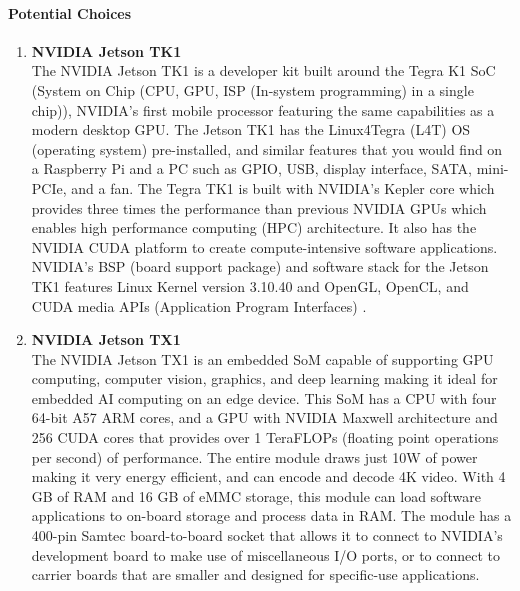 \paragraph{Potential Choices}
	\begin{enumerate}
		\item\textbf{NVIDIA Jetson TK1}\\
			The NVIDIA Jetson TK1 is a developer kit built around the Tegra K1 SoC (System 
			on Chip (CPU, GPU, ISP (In-system programming) in a single chip)), NVIDIA's first 
			mobile processor featuring the same capabilities as a 
			modern desktop GPU\cite{JetsonTK1, TK1Wiki}. The Jetson TK1 has the Linux4Tegra (L4T)
			OS (operating system) pre-installed, and similar features that you would find on a 
			Raspberry Pi and a PC such as GPIO, USB, display interface, SATA, mini-PCIe, and a
			fan\cite{RPiHDWR, TK1Wiki}. The Tegra TK1 is built with NVIDIA's Kepler core which 
			provides three times the performance than previous NVIDIA GPUs which enables high 
			performance computing (HPC) architecture. It also has the NVIDIA CUDA platform to 
			create compute-intensive software applications\cite{KeplerArch}. NVIDIA's BSP (board 
			support package) and software stack for the Jetson TK1 features Linux Kernel version 
			3.10.40 and OpenGL, OpenCL, and CUDA media APIs (Application Program Interfaces)
			\cite{TK1L4T}. \\

		\item\textbf{NVIDIA Jetson TX1}\\
			The NVIDIA Jetson TX1 is an embedded SoM capable of supporting GPU computing, computer 
			vision, graphics, and deep learning making it ideal for embedded AI computing
			on an edge device. This SoM has a CPU with four 64-bit A57 ARM cores, and a GPU with 
			NVIDIA Maxwell architecture and 256 CUDA cores that provides over 1 TeraFLOPs (floating 
			point operations per second) of performance\cite{TX1Wiki, JetsonGenius}. The entire module 
			draws just 10W of power making it very energy efficient, and can encode and decode 4K 
			video. With 4 GB of RAM and 16 GB of eMMC storage, this module can load software 
			applications to on-board storage and process data in RAM\cite{LinuxDot}. The module has 
			a 400-pin Samtec board-to-board socket that allows it to connect to NVIDIA's development
			board to make use of miscellaneous I/O ports, or to connect to carrier boards that are 
			smaller and designed for specific-use applications.\\


\end{enumerate}
